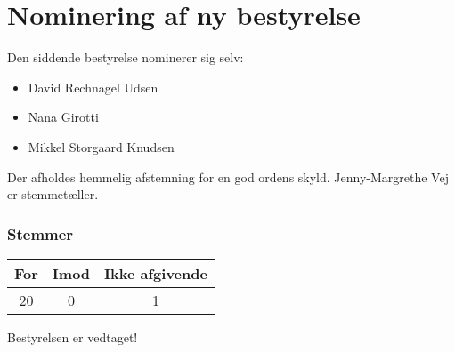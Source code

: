 \documentclass[a4paper,11pt]{report}
\begin{document}
\section*{Nominering af ny bestyrelse}

Den siddende bestyrelse nominerer sig selv:

\begin{itemize}
\item David Rechnagel Udsen
\item Nana Girotti
\item Mikkel Storgaard Knudsen
\end{itemize}

Der afholdes hemmelig afstemning for en god ordens skyld.  Jenny-Margrethe Vej
er stemmetæller.

\subsubsection*{Stemmer}
\begin{tabular}{ c | c | c }
For & Imod & Ikke afgivende \\
\hline
20 & 0 & 1 \\
\end{tabular}

Bestyrelsen er vedtaget!
\end{document}
